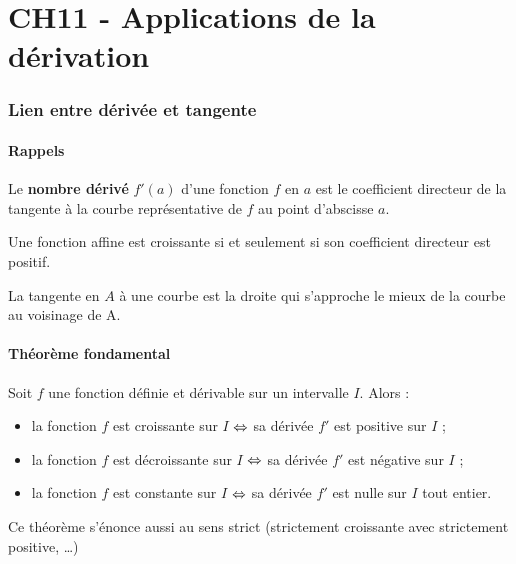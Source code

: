 \documentclass[a4paper,11pt]{article}
\author{Pierquet}
\title{\nomfichier}
\begin{document}
\pagestyle{fancy}

\part{CH11 - Applications de la dérivation}

\section{Lien entre dérivée et tangente}

\subsection{Rappels}

\begin{crappel}[s]
Le \textbf{nombre dérivé} $f'(a)$ d'une fonction $f$ en $a$ est le coefficient directeur de la tangente à la courbe représentative de $f$ au point d’abscisse $a$.

\smallskip

Une fonction affine est croissante si et seulement si son coefficient directeur est positif.

\smallskip

La tangente en $A$ à une courbe est la droite qui s'approche le mieux de la courbe au voisinage de A.
\end{crappel}

\subsection{Théorème fondamental}

\begin{cthm}
Soit $f$ une fonction définie et dérivable sur un intervalle $I$. Alors :
\begin{itemize}
	\item la fonction $f$ est croissante sur $I$ $\Leftrightarrow$ sa dérivée $f'$ est positive sur $I$ ;
	\item la fonction $f$ est décroissante sur $I$ $\Leftrightarrow$ sa dérivée $f'$ est négative sur $I$ ;
	\item la fonction $f$ est constante sur $I$ $\Leftrightarrow$ sa dérivée $f'$ est nulle sur $I$ tout entier.
\end{itemize}
\end{cthm}

\begin{crmq}
Ce théorème s’énonce aussi au sens strict (strictement croissante avec strictement positive, \ldots)
\end{crmq}
\end{document}
